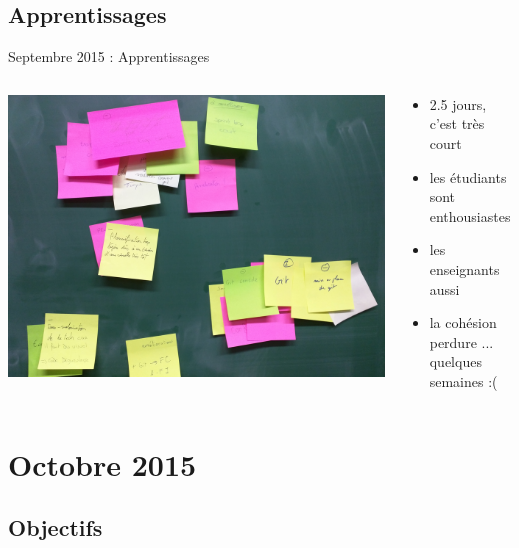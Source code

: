 \documentclass{beamer}
\begin{document}
\subsection{Apprentissages}
\begin{frame}{Septembre 2015 : Apprentissages}
  \begin{columns}
    \begin{column}{0.5\textwidth}
      \begin{center}
        \includegraphics[width=\textwidth]{includes/201509_retro.jpg}      
      \end{center}
    \end{column}
    \begin{column}{0.5\textwidth}
  \begin{itemize}
    \item 2.5 jours, c'est très court
    \item les étudiants sont enthousiastes
    \item les enseignants aussi
    \item la cohésion perdure ... quelques semaines :(
  \end{itemize}
    \end{column}
  \end{columns}
\end{frame}

\section{Octobre 2015}
\subsection{Objectifs}
\end{document}
